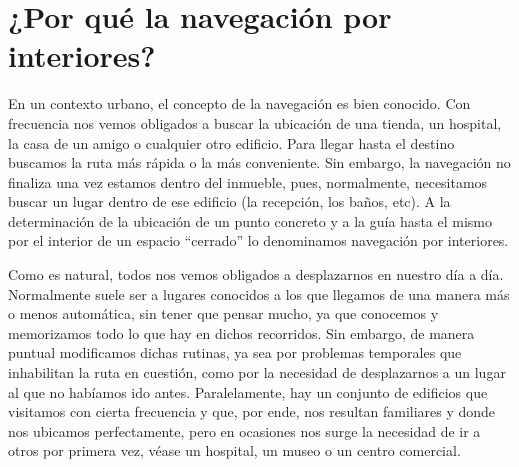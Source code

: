 



\section{¿Por qué la navegación por interiores?}

En un contexto urbano, el concepto de la navegación es bien conocido. Con frecuencia nos vemos obligados a buscar la ubicación de una tienda, un hospital, la casa de un amigo o cualquier otro edificio. Para llegar hasta el destino buscamos la ruta más rápida o la más conveniente. Sin embargo, la navegación no finaliza una vez estamos dentro del inmueble, pues, normalmente, necesitamos buscar un lugar dentro de ese edificio (la recepción, los baños, etc). A la determinación de la ubicación de un punto concreto y a la guía hasta el mismo por el interior de un espacio ``cerrado'' lo denominamos navegación por interiores.

Como es natural, todos nos vemos obligados a desplazarnos en nuestro día a día. Normalmente suele ser a lugares conocidos a los que llegamos de una manera más o menos automática, sin tener que pensar mucho, ya que conocemos y memorizamos todo lo que hay en dichos recorridos. Sin embargo, de manera puntual modificamos dichas rutinas, ya sea por problemas temporales que inhabilitan la ruta en cuestión, como por la necesidad de desplazarnos a un lugar al que no habíamos ido antes. Paralelamente, hay un conjunto de edificios que visitamos con cierta frecuencia y que, por ende, nos resultan familiares y donde nos ubicamos perfectamente, pero en ocasiones nos surge la necesidad de ir a otros por primera vez, véase un hospital, un museo o un centro comercial. 

